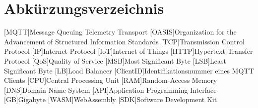 

\section*{Abkürzungsverzeichnis}
\begin{acronym}[xxxxxxxxxx] %
    [MQTT]{Message Queuing Telemetry Transport}
    [OASIS]{Organization for the Advancement of Structured Information Standards}
    [TCP]{Transmission Control Protocol}
    [IP]{Internet Protocol}
    [IoT]{Internet of Things}
    [HTTP]{Hypertext Transfer Protocol}
    [QoS]{Quality of Service}
    [MSB]{Most Significant Byte}
    [LSB]{Least Significant Byte}
    [LB]{Load Balancer}
    [ClientID]{Identifikationsnummer eines MQTT Clients}
    [CPU]{Central Processing Unit}
    [RAM]{Random-Access Memory}
    [DNS]{Domain Name System}
    [API]{Application Programming Interface}
    [GB]{Gigabyte}
    [WASM]{WebAssembly}
    [SDK]{Software Development Kit}
\end{acronym}
